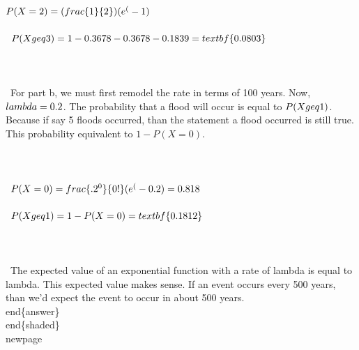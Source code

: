 {    $P(X=2) = (\\frac\{1\}\{2\})(e^(-1)$ \\\\ \
    $P(X\\geq 3) = 1 - 0.3678 - 0.3678 - 0.1839 = \\textbf\{0.0803\}$ \\\\ \\\\ \
    For part b, we must first remodel the rate in terms of 100 years. Now, $\\lambda = 0.2$. The probability that a flood will occur is equal to $P(X\\geq 1)$. Because if say 5 floods occurred, than the statement a flood occurred is still true. This probability equivalent to $1 - P(X=0)$. \\\\ \\\\ \
    $P(X=0) = \\frac\{.2^0\}\{0!\}(e^(-0.2) = 0.818$ \\\\ \
    $P(X\\geq 1) = 1 - P(X=0) = \\textbf\{0.1812\}$ \\\\ \\\\ \
    The expected value of an exponential function with a rate of lambda is equal to lambda. This expected value makes sense. If an event occurs every 500 years, than we'd expect the event to occur in about 500 years. \
    \\end\{answer\}\
    \\end\{shaded\} \\newpage }